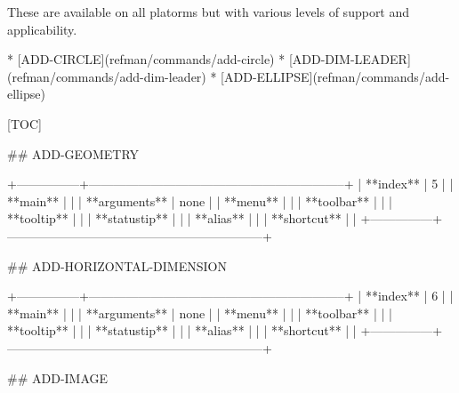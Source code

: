 These are available on all platorms but with various levels of support and
applicability.





* [ADD-CIRCLE](refman/commands/add-circle)
* [ADD-DIM-LEADER](refman/commands/add-dim-leader)
* [ADD-ELLIPSE](refman/commands/add-ellipse)

[TOC]

## ADD-GEOMETRY

+---------------+--------------------------------------------------------------+
| **index**     | 5                                                            |
| **main**      |                                                              |
| **arguments** | none                                                         |
| **menu**      |                                                              |
| **toolbar**   |                                                              |
| **tooltip**   |                                                              |
| **statustip** |                                                              |
| **alias**     |                                                              |
| **shortcut**  |                                                              |
+---------------+--------------------------------------------------------------+

## ADD-HORIZONTAL-DIMENSION

+---------------+--------------------------------------------------------------+
| **index**     | 6                                                            |
| **main**      |                                                              |
| **arguments** | none                                                         |
| **menu**      |                                                              |
| **toolbar**   |                                                              |
| **tooltip**   |                                                              |
| **statustip** |                                                              |
| **alias**     |                                                              |
| **shortcut**  |                                                              |
+---------------+--------------------------------------------------------------+


## ADD-IMAGE

